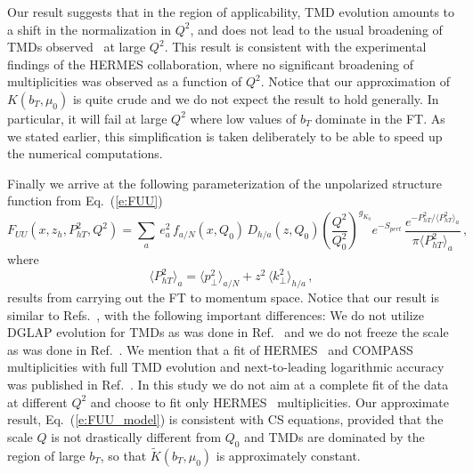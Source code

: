\documentclass[final,3p,times,onecolumn,sort&compress,hidelinks]{elsarticle}
\newcommand\3[1]{\boldsymbol{#1}}
\newcommand{\crd}{\color{red}}
\begin{document}
Our result suggests that in the region of applicability, TMD evolution  amounts to a  shift in the normalization in $Q^2$, and does not lead to the usual broadening of TMDs observed~\cite{Collins:2011zzd} at large $Q^2$. This result is consistent with the experimental findings \cite{Airapetian:2012ki} of the  HERMES collaboration, where no significant broadening of multiplicities was observed as a function of $Q^2$. Notice that our approximation of $K(b_T,\mu_0)$ is  quite crude  and  we do not expect the result to hold  generally.  In particular, it will fail at large $Q^2$ where low values of $b_T$ dominate in the FT.  As we stated earlier, this simplification is taken deliberately to be able to speed up the numerical computations.


Finally we arrive at the following parameterization of the unpolarized structure function from Eq.~(\ref{e:FUU}) 
\begin{equation}
F_{UU}(x,z_h,P_{hT}^2,Q^2)  =  \sum_{a} \, e_a^2 \,f_{a/N}(x, Q_0)\,D_{h/a}(z, Q_0) \left( \frac{Q^2}{Q_0^2}\right)^{g_{K_0}}e^{-S_{pert}}\,
\frac{e^{-P_{hT}^2/\langle P_{hT}^2 \rangle_a}}{\pi\langle P_{hT}^2 \rangle_a}\,, \label{e:FUU_model}
\end{equation}
 where
\begin{equation}
\langle P_{hT}^2 \rangle_a = \langle p_\perp^2 \rangle_{a/N} + z^2\, \langle k_\perp^2 \rangle_{h/a}\,, \label{e:avg_kT}
\end{equation}
results from carrying out the  FT to momentum space.
Notice that our result is similar to Refs.~\cite{Anselmino:2013lza,Signori:2013mda}, with the following important differences:
We do not utilize DGLAP evolution for TMDs as was done in Ref.~\cite{Anselmino:2013lza} and we do not freeze the scale as was done in Ref.~\cite{Signori:2013mda}. We mention that a fit of HERMES~\cite{Airapetian:2012ki}  and COMPASS~\cite{Adolph:2013stb} multiplicities with full TMD evolution and next-to-leading logarithmic accuracy was published in Ref.~\cite{Bacchetta:2017gcc}. In this study we do not aim at a complete fit of the data at different $Q^2$ and choose to fit only HERMES~\cite{Airapetian:2012ki} multiplicities.
Our  approximate result, Eq.~(\ref{e:FUU_model}) is consistent with CS equations, provided that the scale $Q$ is not drastically different from $Q_0$ and TMDs are dominated by the region of large $b_T$, so that $\tilde K(b_T,\mu_0)$ is approximately constant.
\end{document}
